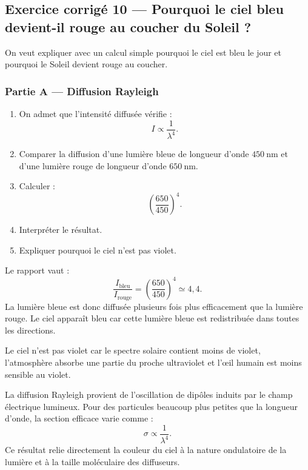 \documentclass[11pt,a4paper]{article}
\begin{document}
\subsection{Exercice corrigé 10 — Pourquoi le ciel bleu devient-il rouge au coucher du Soleil ?}

\begin{exercicebox}
On veut expliquer avec un calcul simple pourquoi le ciel est bleu le jour et pourquoi le Soleil devient rouge au coucher.
\end{exercicebox}

\subsubsection*{Partie A — Diffusion Rayleigh}

\begin{enumerate}
  \item On admet que l'intensité diffusée vérifie :
  \[
  I\propto \frac{1}{\lambda^4}.
  \]
  \item Comparer la diffusion d'une lumière bleue de longueur d'onde \(450\ \mathrm{nm}\) et d'une lumière rouge de longueur d'onde \(650\ \mathrm{nm}\).
  \item Calculer :
  \[
  \left(\frac{650}{450}\right)^4.
  \]
  \item Interpréter le résultat.
  \item Expliquer pourquoi le ciel n'est pas violet.
\end{enumerate}

\begin{corrigebox}
Le rapport vaut :
\[
\frac{I_{\mathrm{bleu}}}{I_{\mathrm{rouge}}}
=
\left(\frac{650}{450}\right)^4
\simeq 4{,}4.
\]
La lumière bleue est donc diffusée plusieurs fois plus efficacement que la lumière rouge. Le ciel apparaît bleu car cette lumière bleue est redistribuée dans toutes les directions.

Le ciel n'est pas violet car le spectre solaire contient moins de violet, l'atmosphère absorbe une partie du proche ultraviolet et l'œil humain est moins sensible au violet.
\end{corrigebox}

\begin{approfondissementbox}
La diffusion Rayleigh provient de l'oscillation de dipôles induits par le champ électrique lumineux. Pour des particules beaucoup plus petites que la longueur d'onde, la section efficace varie comme :
\[
\sigma\propto\frac{1}{\lambda^4}.
\]
Ce résultat relie directement la couleur du ciel à la nature ondulatoire de la lumière et à la taille moléculaire des diffuseurs.
\end{approfondissementbox}
\end{document}
